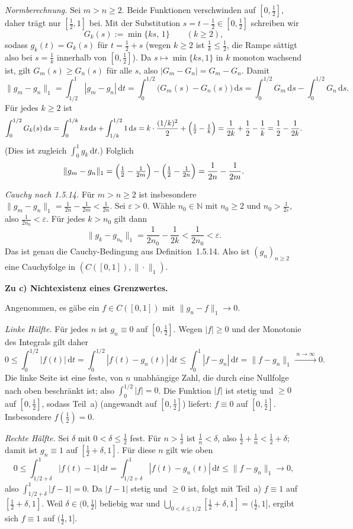 \documentclass[a4paper,11pt]{article}
\begin{document}
\emph{Normberechnung.} Sei $m>n\ge 2$. Beide Funktionen verschwinden auf $[0,\tfrac12]$, daher trägt nur $[\tfrac12,1]$ bei. Mit der Substitution $s=t-\tfrac12\in[0,\tfrac12]$ schreiben wir
\[
G_k(s):=\min\{k s,\,1\}\qquad(k\ge 2),
\]
sodass $g_k(t)=G_k(s)$ für $t=\tfrac12+s$ (wegen $k\ge 2$ ist $\tfrac1k\le\tfrac12$, die Rampe sättigt also bei $s=\tfrac1k$ innerhalb von $[0,\tfrac12]$). Da $s\mapsto\min\{ks,1\}$ in $k$ monoton wachsend ist, gilt $G_m(s)\ge G_n(s)$ für alle $s$, also $|G_m-G_n|=G_m-G_n$. Damit
\[
\|g_m-g_n\|_1=\int_{1/2}^{1}\!\!|g_m-g_n|\,\mathrm{d}t
=\int_0^{1/2}\!\!\bigl(G_m(s)-G_n(s)\bigr)\,\mathrm{d}s
=\int_0^{1/2}\!\!G_m\,\mathrm{d}s-\int_0^{1/2}\!\!G_n\,\mathrm{d}s.
\]
Für jedes $k\ge 2$ ist
\[
\int_0^{1/2} G_k(s)\,\mathrm{d}s
=\int_0^{1/k} k s\,\mathrm{d}s+\int_{1/k}^{1/2} 1\,\mathrm{d}s
=k\cdot\frac{(1/k)^2}{2}+\Bigl(\tfrac12-\tfrac1k\Bigr)
=\frac{1}{2k}+\frac12-\frac1k=\frac12-\frac{1}{2k}.
\]
(Dies ist zugleich $\int_0^1 g_k\,\mathrm{d}t$.) Folglich
\[
\|g_m-g_n\|_1=\Bigl(\tfrac12-\tfrac{1}{2m}\Bigr)-\Bigl(\tfrac12-\tfrac{1}{2n}\Bigr)
=\frac{1}{2n}-\frac{1}{2m}.
\]

\emph{Cauchy nach 1.5.14.} Für $m>n\ge 2$ ist insbesondere $\|g_m-g_n\|_1=\tfrac{1}{2n}-\tfrac{1}{2m}<\tfrac{1}{2n}$. Sei $\varepsilon>0$. Wähle $n_0\in\mathbb{N}$ mit $n_0\ge 2$ und $n_0>\tfrac{1}{2\varepsilon}$, also $\tfrac{1}{2n_0}<\varepsilon$. Für jedes $k>n_0$ gilt dann
\[
\|g_k-g_{n_0}\|_1=\frac{1}{2n_0}-\frac{1}{2k}<\frac{1}{2n_0}<\varepsilon.
\]
Das ist genau die Cauchy-Bedingung aus Definition~1.5.14. Also ist $(g_n)_{n\ge 2}$ eine Cauchyfolge in $(C([0,1]),\|\cdot\|_1)$.

\medskip
\textbf{Zu c) Nichtexistenz eines Grenzwertes.}

Angenommen, es gäbe ein $f\in C([0,1])$ mit $\|g_n-f\|_1\to 0$.

\emph{Linke Hälfte.} Für jedes $n$ ist $g_n\equiv 0$ auf $[0,\tfrac12]$. Wegen $|f|\ge 0$ und der Monotonie des Integrals gilt daher
\[
0\le\int_0^{1/2}|f(t)|\,\mathrm{d}t
=\int_0^{1/2}|f(t)-g_n(t)|\,\mathrm{d}t
\le\int_0^{1}|f-g_n|\,\mathrm{d}t=\|f-g_n\|_1\xrightarrow{\;n\to\infty\;}0.
\]
Die linke Seite ist eine feste, von $n$ unabhängige Zahl, die durch eine Nullfolge nach oben beschränkt ist; also $\int_0^{1/2}|f|=0$. Die Funktion $|f|$ ist stetig und $\ge 0$ auf $[0,\tfrac12]$, sodass Teil~a) (angewandt auf $[0,\tfrac12]$) liefert: $f\equiv 0$ auf $[0,\tfrac12]$. Insbesondere $f(\tfrac12)=0$.

\emph{Rechte Hälfte.} Sei $\delta$ mit $0<\delta\le\tfrac12$ fest. Für $n>\tfrac1\delta$ ist $\tfrac1n<\delta$, also $\tfrac12+\tfrac1n<\tfrac12+\delta$; damit ist $g_n\equiv 1$ auf $[\tfrac12+\delta,1]$. Für diese $n$ gilt wie oben
\[
0\le\int_{1/2+\delta}^{1}|f(t)-1|\,\mathrm{d}t
=\int_{1/2+\delta}^{1}|f(t)-g_n(t)|\,\mathrm{d}t
\le\|f-g_n\|_1\to 0,
\]
also $\int_{1/2+\delta}^{1}|f-1|=0$. Da $|f-1|$ stetig und $\ge 0$ ist, folgt mit Teil~a) $f\equiv 1$ auf $[\tfrac12+\delta,1]$. Weil $\delta\in(0,\tfrac12]$ beliebig war und $\bigcup_{0<\delta\le 1/2}[\tfrac12+\delta,1]=(\tfrac12,1]$, ergibt sich $f\equiv 1$ auf $(\tfrac12,1]$.
\end{document}
